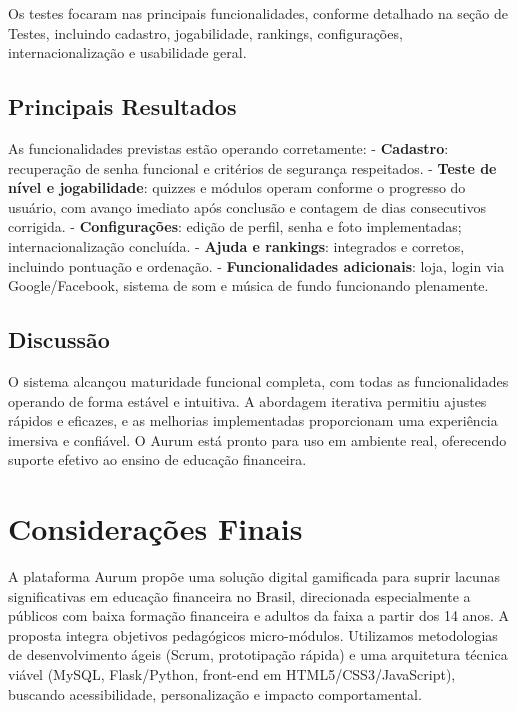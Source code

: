 \documentclass[
	article,			%
	12pt,				%
	oneside,			%
	a4paper,			%
	english,			%
	brazil,				%
	sumario=tradicional
	]{abntex2}
\begin{document}
Os testes focaram nas principais funcionalidades, conforme detalhado na seção de Testes, incluindo cadastro, jogabilidade, rankings, configurações, internacionalização e usabilidade geral.

\subsection{Principais Resultados}

As funcionalidades previstas estão operando corretamente:  
- \textbf{Cadastro}: recuperação de senha funcional e critérios de segurança respeitados.  
- \textbf{Teste de nível e jogabilidade}: quizzes e módulos operam conforme o progresso do usuário, com avanço imediato após conclusão e contagem de dias consecutivos corrigida.  
- \textbf{Configurações}: edição de perfil, senha e foto implementadas; internacionalização concluída.  
- \textbf{Ajuda e rankings}: integrados e corretos, incluindo pontuação e ordenação.  
- \textbf{Funcionalidades adicionais}: loja, login via Google/Facebook, sistema de som e música de fundo funcionando plenamente.

\subsection{Discussão}

O sistema alcançou maturidade funcional completa, com todas as funcionalidades operando de forma estável e intuitiva. A abordagem iterativa permitiu ajustes rápidos e eficazes, e as melhorias implementadas proporcionam uma experiência imersiva e confiável. O Aurum está pronto para uso em ambiente real, oferecendo suporte efetivo ao ensino de educação financeira.

\section{Considerações Finais}



A plataforma Aurum propõe uma solução digital gamificada para suprir lacunas significativas em educação financeira no Brasil, direcionada especialmente a públicos com baixa formação financeira e adultos da faixa a partir dos 14 anos. A proposta integra objetivos pedagógicos micro-módulos. Utilizamos metodologias de desenvolvimento ágeis (Scrum, prototipação rápida) e uma arquitetura técnica viável (MySQL, Flask/Python, front-end em HTML5/CSS3/JavaScript), buscando acessibilidade, personalização e impacto comportamental.
\end{document}
